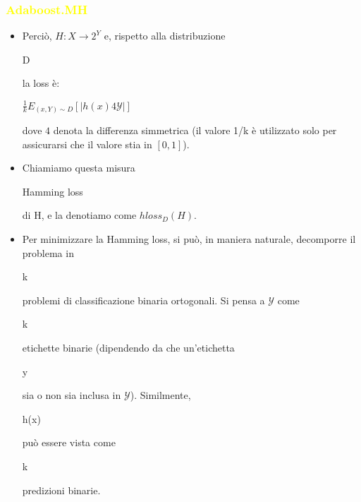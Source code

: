 \documentclass[handout
]{beamer}
\def\yellow#1{{\textcolor{yellow}{#1}}}
\begin{document}
\begin{frame}
\frametitle{\yellow{Adaboost.MH}}
 \begin{itemize}
  \item Perci\`o, 
\begin{math} H : X \rightarrow 2^Y\end{math} e, rispetto alla distribuzione \begin{it} D\end{it} 
la loss \`e:
\begin{center}
 \begin{math}
 \frac{1}{k} E_{(x,Y) \sim  D} \left[|h(x) \mathcal{4} \mathcal{Y} | \right]
 \end{math}
\end{center}
dove \begin{math}
      \mathcal{4}
     \end{math} denota la differenza simmetrica (il valore 1/k \`e utilizzato solo per assicurarsi che 
il valore stia in \begin{math}
                   \left[0,1\right]
                  \end{math}).
\item Chiamiamo questa misura \begin{it}
                                                        Hamming loss
                                                       \end{it} di H, e la denotiamo come
\begin{math}
 hloss_D(H)
\end{math}.
\item Per minimizzare la Hamming loss, si pu\`o, in maniera naturale, decomporre il problema in 
\begin{it}k\end{it} problemi di classificazione binaria ortogonali. Si pensa a 
\begin{math}\mathcal{Y}\end{math} come \begin{it}k\end{it} 
etichette binarie (dipendendo da che un'etichetta \begin{it}y\end{it} sia o 
non sia inclusa in \begin{math}\mathcal{Y}\end{math}). 
Similmente, \begin{it}h(x)\end{it} pu\`o essere vista come \begin{it}k\end{it} predizioni binarie.
 \end{itemize}

\end{frame}
\end{document}

